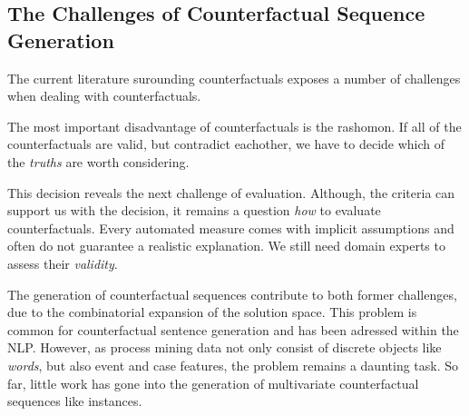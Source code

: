 \documentclass[./../../paper.tex]{subfiles}
\begin{document}
\subsection{The Challenges of Counterfactual Sequence Generation}
The current literature surounding counterfactuals exposes a number of challenges when dealing with counterfactuals.

The most important disadvantage of counterfactuals is the \gls{rashomon}\autocite[ch.9.3]{molnar2019}. If all of the counterfactuals are valid, but contradict eachother, we have to decide which of the \emph{truths} are worth considering.

This decision reveals the next challenge of evaluation\needscite{}. Although, the criteria can support us with the decision, it remains a question \emph{how} to evaluate counterfactuals. Every automated measure comes with implicit assumptions and often do not guarantee a realistic explanation. We still need domain experts to assess their \emph{validity}.

The generation of counterfactual sequences contribute to both former challenges, due to the combinatorial expansion of the solution space. This problem is common for counterfactual sentence generation and has been adressed within the \gls{NLP}\needscite{}. However, as process mining data not only consist of discrete objects like \emph{words}, but also event and case features, the problem remains a daunting task. So far, little work has gone into the generation of multivariate counterfactual sequences like \glspl{instance}\needscite{}.


\end{document}
